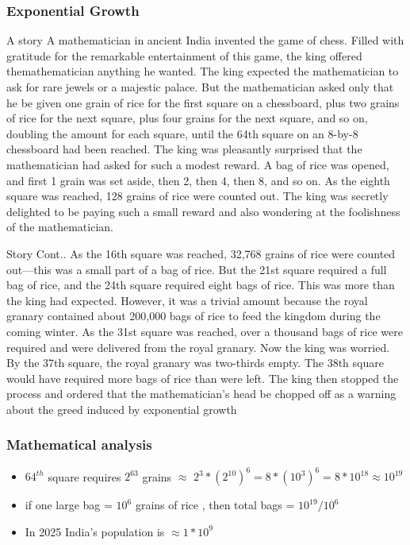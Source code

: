 \documentclass{beamer}
\begin{document}
  \begin{frame}
  \frametitle{Exponential Growth}
  \begin{block}{A story}
A mathematician in ancient India invented the game of chess. Filled with gratitude for the remarkable entertainment of this game, the king offered themathematician anything he wanted. The king expected the mathematician to
ask for rare jewels or a majestic palace.
But the mathematician asked only that he be given one grain of rice for the
first square on a chessboard, plus two grains of rice for the next square, plus
four grains for the next square, and so on, doubling the amount for each square,
until the 64th square on an 8-by-8 chessboard had been reached. The king was
pleasantly surprised that the mathematician had asked for such a modest reward.
A bag of rice was opened, and first 1 grain was set aside, then 2, then 4, then 8,
and so on. As the eighth square  was
reached, 128 grains of rice were counted out. The king was secretly delighted
to be paying such a small reward and also wondering at the foolishness of the
mathematician.
  \end{block}
  
  \end{frame}

  \begin{frame}
    \begin{block}{Story Cont..}
      As the 16th square was reached, 32,768 grains of rice were counted out—this
was a small part of a bag of rice. But the 21st square required a full bag of rice,
and the 24th square required eight bags of rice. This was more than the king had
expected. However, it was a trivial amount because the royal granary contained
about 200,000 bags of rice to feed the kingdom during the coming winter.
As the 31st square was reached, over a thousand bags of rice were required
and were delivered from the royal granary. Now the king was worried. By the
37th square, the royal granary was two-thirds empty. The 38th square would have
required more bags of rice than were left. The king then stopped the process
and ordered that the mathematician's head be chopped off as a warning about
the greed induced by exponential growth
    \end{block}
  \end{frame}
  \begin{frame}
    \frametitle{Mathematical analysis}
    \begin{itemize}
      \item \(64^{th}\) square requires \( 2^{63} \) grains \(\approx\) \(2^{3}* (2^{10})^{6} = 8*(10^{3})^{6} = 8*10^{18} \approx 10^{19} \) 
      \item if one large bag = \(10^{6} \) grains of rice , then total bags = \(10^{19}/10^{6} \) 
      \item In 2025 India's population is \(\approx 1 * 10^{9} \)
    \end{itemize}
     
    \end{frame}
\end{document}
